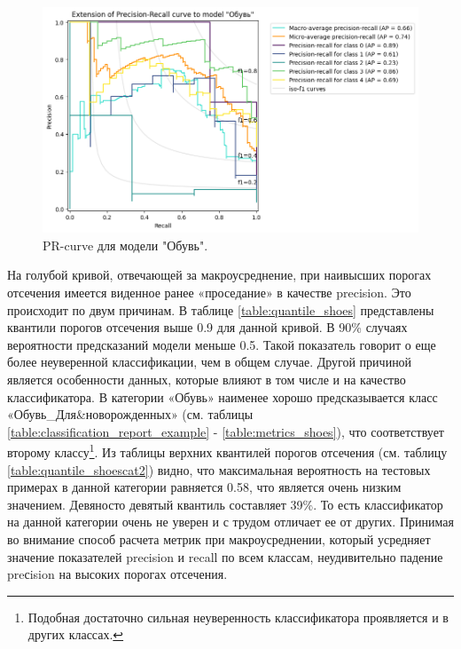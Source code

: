 \documentclass[a4paper,12pt]{extarticle}
\begin{document}
\begin{figure}[ht]
	\centering
	\includegraphics[scale=0.6]{pr_curves/prcurve_Обувь.png}
	\caption{PR-curve для модели "Обувь".}
	\label{fig:prcurve_Обувь2}
\end{figure}

На голубой кривой, отвечающей за макроусреднение, при наивысших порогах отсечения имеется виденное ранее «проседание» в качестве precision. Это происходит по двум причинам. В таблице \ref{table:quantile_shoes} представлены квантили порогов отсечения выше 0.9 для данной кривой. В 90\% случаях вероятности предсказаний модели меньше 0.5. Такой показатель говорит о еще более неуверенной классификации, чем в общем случае. Другой причиной является особенности данных, которые влияют в том числе и на качество классификатора. В категории «Обувь» наименее хорошо предсказывается класс «Обувь\_Для\&новорожденных» (см. таблицы \ref{table:classification_report_example} - \ref{table:metrics_shoes}), что соответствует второму классу\footnote{Подобная достаточно сильная неуверенность классификатора проявляется и в других классах.}. Из таблицы верхних квантилей порогов отсечения (см. таблицу \ref{table:quantile_shoescat2}) видно, что максимальная вероятность на тестовых примерах в данной категории равняется 0.58, что является очень низким значением. Девяносто девятый квантиль составляет 39\%. То есть классификатор на данной категории очень не уверен и с трудом отличает ее от других. Принимая во внимание способ расчета метрик при макроусреднении, который усредняет значение показателей precision и recall по всем классам, неудивительно падение preсision на высоких порогах отсечения.
\end{document}
